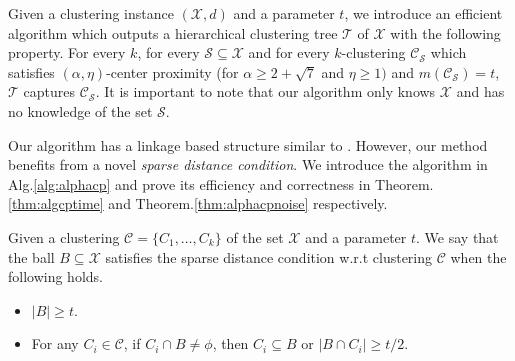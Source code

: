 \documentclass[orivec]{llncs}
\newcommand{\mc}{\mathcal}
\begin{document}
Given a clustering instance $(\mc X, d)$ and a parameter $t$, we introduce an efficient algorithm which outputs a hierarchical clustering tree $\mc T$ of $\mc X$ with the following property. For every $k$, for every $\mc S \subseteq \mc X$ and for every $k$-clustering $\mc C_{\mc S}$ which satisfies $(\alpha, \eta)$-center proximity (for $\alpha \ge 2 + \sqrt{7}$ and $ \eta \ge 1)$ and $m(\mc C_{\mc S}) = t$, $\mc T$ captures $\mc C_{\mc S}$. It is important to note that our algorithm only knows $\mc X$ and has no knowledge of the set $\mc S$.

Our algorithm has a linkage based structure similar to \cite{balcan2012clustering}. However, our method benefits from a novel {\it sparse distance condition}. We introduce the algorithm in Alg.\ref{alg:alphacp} and prove its efficiency and correctness in Theorem. \ref{thm:algcptime} and Theorem.\ref{thm:alphacpnoise} respectively. 

\begin{definition}
	 Given a clustering $\mc C = \{C_1,\ldots,C_k\}$ of the set $\mc X$ and a parameter $t$. We say that the ball $B \subseteq \mc X$ satisfies the sparse distance condition w.r.t clustering $\mc C$ when the following holds.
\begin{itemize}[noitemsep,nolistsep,leftmargin=*]
\item $|B| \ge t$.
\item For any $C_i \in \mc C$, if $C_i \cap B \neq \phi$, then $C_i \subseteq B$ or $|B \cap C_i| \ge t/2$.
\end{itemize}
\end{definition}
\end{document}
